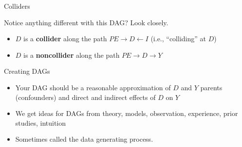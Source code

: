 \documentclass{beamer}
\begin{document}
\begin{frame}{Colliders}

  \begin{center}
  \end{center}

  \bigskip

  Notice anything different with this DAG?  Look closely.
  \begin{itemize}

    \item $D$ is a \textbf{collider} along the path $PE\rightarrow D\leftarrow I$ (i.e., ``colliding'' at $D$)
    \item $D$ is a \textbf{noncollider} along the path $PE\rightarrow D\rightarrow Y$

  \end{itemize}

\end{frame}



\begin{frame}{Creating DAGs}

	\begin{itemize}
	\item Your DAG should be a reasonable approximation of $D$ and $Y$ parents (confounders) and direct and indirect effects of $D$ on $Y$
	\item We get ideas for DAGs from theory, models, observation, experience, prior studies, intuition
	\item Sometimes called the data generating process.
	\end{itemize}

\end{frame}

\end{document}

